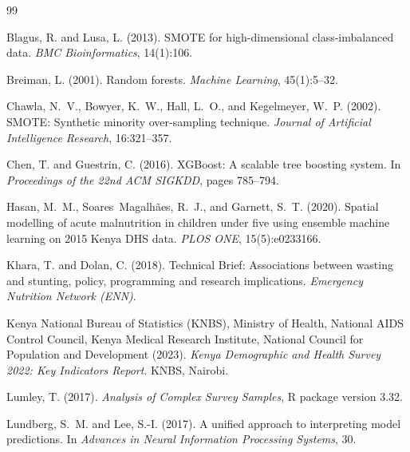 \documentclass[12pt, a4paper]{article}
\begin{document}

\begin{thebibliography}{99}

Blagus, R. and Lusa, L. (2013).
\newblock SMOTE for high-dimensional class-imbalanced data.
\newblock \textit{BMC Bioinformatics}, 14(1):106.

Breiman, L. (2001).
\newblock Random forests.
\newblock \textit{Machine Learning}, 45(1):5--32.

Chawla, N.~V., Bowyer, K.~W., Hall, L.~O., and Kegelmeyer, W.~P. (2002).
\newblock SMOTE: Synthetic minority over-sampling technique.
\newblock \textit{Journal of Artificial Intelligence Research}, 16:321--357.

Chen, T. and Guestrin, C. (2016).
\newblock XGBoost: A scalable tree boosting system.
\newblock In \textit{Proceedings of the 22nd ACM SIGKDD}, pages 785--794.

Hasan, M.~M., Soares~Magalh\~{a}es, R.~J., and Garnett, S.~T. (2020).
\newblock Spatial modelling of acute malnutrition in children under five using
ensemble machine learning on 2015 Kenya DHS data.
\newblock \textit{PLOS ONE}, 15(5):e0233166.

Khara, T. and Dolan, C. (2018).
\newblock Technical Brief: Associations between wasting and stunting,
policy, programming and research implications.
\newblock \textit{Emergency Nutrition Network (ENN)}.

Kenya National Bureau of Statistics (KNBS), Ministry of Health, National AIDS
Control Council, Kenya Medical Research Institute, National Council for
Population and Development (2023).
\newblock \textit{Kenya Demographic and Health Survey 2022: Key Indicators
Report}.
\newblock KNBS, Nairobi.

Lumley, T. (2017).
\newblock \textit{Analysis of Complex Survey Samples}, R package version 3.32.

Lundberg, S.~M. and Lee, S.-I. (2017).
\newblock A unified approach to interpreting model predictions.
\newblock In \textit{Advances in Neural Information Processing Systems}, 30.


\end{thebibliography}
\end{document}
